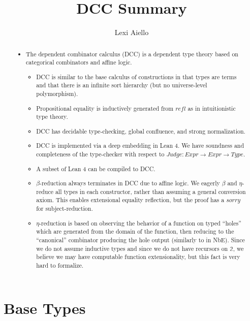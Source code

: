 \documentclass{article}
\title{DCC Summary}
\author{Lexi Aiello}
\begin{document}
\maketitle

\begin{abstract}
  \begin{itemize}
  \item The dependent combinator calculus (DCC) is a dependent type theory based on categorical combinators \cite{CURIEN1986188} and affine logic.
    \begin{itemize}
      \item DCC is similar to the base calculus of constructions in that types are terms and that there is an infinite sort hierarchy (but no universe-level polymorphism).
      \item Propositional equality is inductively generated from \(refl\) as in intuitionistic type theory.
      \item DCC has decidable type-checking, global confluence, and strong normalization.
      \item DCC is implemented via a deep embedding in Lean 4. We have soundness and completeness of the type-checker with respect to \(Judge : Expr \rightarrow Expr \rightarrow Type\).
      \item A subset of Lean 4 can be compiled to DCC.
      \item \(\beta\)-reduction always terminates in DCC due to affine logic. We eagerly \(\beta\) and \(\eta\)-reduce all types in each constructor, rather than assuming a general conversion axiom. This enables extensional equality reflection, but the proof has a \(sorry\) for subject-reduction.
      \item \(\eta\)-reduction is based on observing the behavior of a function on typed ``holes'' which are generated from the domain of the function, then reducing to the ``canonical'' combinator producing the hole output (similarly to in NbE). Since we do not assume inductive types and since we do not have recursors on \(\mathbb{2}\), we believe we may have computable function extensionality, but this fact is very hard to formalize.
      \end{itemize}
  \end{itemize}
\end{abstract}

\section{Base Types}\label{infer:base}
\end{document}
